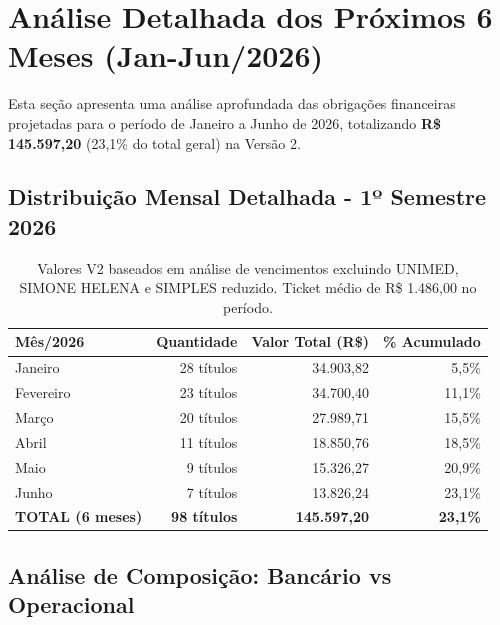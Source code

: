 \documentclass[12pt, a4paper]{article}
\begin{document}
\newpage

\section{Análise Detalhada dos Próximos 6 Meses (Jan-Jun/2026)}

Esta seção apresenta uma análise aprofundada das obrigações financeiras projetadas para o período de Janeiro a Junho de 2026, totalizando \textbf{R\$ 145.597,20} (23,1\% do total geral) na Versão 2.

\subsection{Distribuição Mensal Detalhada - 1º Semestre 2026}

\begin{table}[H]
    \centering
    \renewcommand{\arraystretch}{1.4}
    \begin{tabularx}{\textwidth}{X r r r}
        \toprule
        \rowcolor{tableHeader} \textbf{Mês/2026} & \textbf{Quantidade} & \textbf{Valor Total (R\$)} & \textbf{\% Acumulado} \\
        \midrule
        Janeiro & 28 títulos & 34.903,82 & 5,5\% \\
        Fevereiro & 23 títulos & 34.700,40 & 11,1\% \\
        Março & 20 títulos & 27.989,71 & 15,5\% \\
        Abril & 11 títulos & 18.850,76 & 18,5\% \\
        Maio & 9 títulos & 15.326,27 & 20,9\% \\
        Junho & 7 títulos & 13.826,24 & 23,1\% \\
        \midrule
        \rowcolor{lightGray} \textbf{TOTAL (6 meses)} & \textbf{98 títulos} & \textbf{145.597,20} & \textbf{23,1\%} \\
        \bottomrule
    \end{tabularx}
    \caption*{\footnotesize Valores V2 baseados em análise de vencimentos excluindo UNIMED, SIMONE HELENA e SIMPLES reduzido. Ticket médio de R\$ 1.486,00 no período.}
\end{table}

\subsection{Análise de Composição: Bancário vs Operacional}
\end{document}
